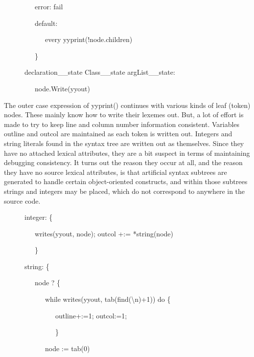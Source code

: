 {\ttfamily\mdseries
\ \ \ \ \ \ \ \ \ {\textquotedbl}error{\textquotedbl}: fail}

{\ttfamily\mdseries
\ \ \ \ \ \ \ \ \ default:}

{\ttfamily\mdseries
\ \ \ \ \ \ \ \ \ \ \ \ every yyprint(!node.children)}

{\ttfamily\mdseries
\ \ \ \ \ \ \ \ \ \}}

{\ttfamily\mdseries
\ \ \ \ \ \ {\textquotedbl}declaration\_\_state{\textquotedbl} {\textbar} {\textquotedbl}Class\_\_state{\textquotedbl}
{\textbar} {\textquotedbl}argList\_\_state{\textquotedbl}:}

{\ttfamily\mdseries
\ \ \ \ \ \ \ \ \ node.Write(yyout)}


The outer case expression of yyprint() continues with various kinds of
leaf (token) nodes. These mainly know how to write their lexemes
out. But, a lot of effort is made to try to keep line and column
number information consistent.  Variables outline and outcol are
maintained as each token is written out. Integers and string literals
found in the syntax tree are written out as themselves. Since they
have no attached lexical attributes, they are a bit suspect in terms
of maintaining debugging consistency. It turns out the reason they
occur at all, and the reason they have no source lexical attributes,
is that artificial syntax subtrees are generated to handle certain
object-oriented constructs, and within those subtrees strings and
integers may be placed, which do not correspond to anywhere in the
source code.

{\ttfamily\mdseries
\ \ \ \ \ \ {\textquotedbl}integer{\textquotedbl}: \{}

{\ttfamily\mdseries
\ \ \ \ \ \ \ \ \ writes(yyout, node); outcol +:= *string(node)}

{\ttfamily\mdseries
\ \ \ \ \ \ \ \ \ \}}

{\ttfamily\mdseries
\ \ \ \ \ \ {\textquotedbl}string{\textquotedbl}: \{}

{\ttfamily\mdseries
\ \ \ \ \ \ \ \ \ node ? \{}

{\ttfamily\mdseries
\ \ \ \ \ \ \ \ \ \ \ \ while writes(yyout, tab(find({\textquotedbl}{\textbackslash}n{\textquotedbl})+1)) do \{}

{\ttfamily\mdseries
\ \ \ \ \ \ \ \ \ \ \ \ \ \ \ outline+:=1; outcol:=1;}

{\ttfamily\mdseries
\ \ \ \ \ \ \ \ \ \ \ \ \ \ \ \}}

{\ttfamily\mdseries
\ \ \ \ \ \ \ \ \ \ \ \ node := tab(0)}

